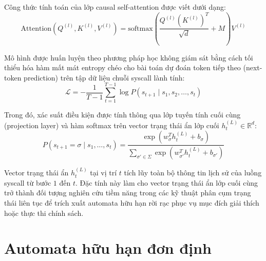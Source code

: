 \documentclass[../main.tex]{subfiles}
\begin{document}
Công thức tính toán của lớp causal self-attention được viết dưới dạng:
\begin{equation}
  \text{Attention}(Q^{(l)}, K^{(l)}, V^{(l)}) =
  \text{softmax}\left(\frac{Q^{(l)} (K^{(l)})^T}{\sqrt{d}} + M\right) V^{(l)}
\end{equation}

Mô hình được huấn luyện theo phương pháp học không giám sát bằng cách
tối thiểu hóa hàm mất mát entropy chéo cho bài toán dự đoán token
tiếp theo (next-token prediction) trên tập dữ liệu chuỗi \gls{syscall} lành tính:
\begin{equation}
  \label{eq:loss}
  \mathcal{L} = -\frac{1}{T-1} \sum_{t=1}^{T-1} \log P(s_{t+1} \mid
  s_1, s_2, \ldots, s_t)
\end{equation}

Trong đó, xác suất điều kiện được tính thông qua lớp tuyến tính cuối
cùng (projection layer) và hàm softmax trên vector trạng thái ẩn lớp
cuối $h_t^{(L)} \in \mathbb{R}^d$:
\begin{equation}
  P(s_{t+1} = \sigma \mid s_1, \ldots, s_t) = \frac{\exp(w_\sigma^T
  h_t^{(L)} + b_\sigma)}{\sum_{\sigma' \in \Sigma} \exp(w_{\sigma'}^T
  h_t^{(L)} + b_{\sigma'})}
\end{equation}

Vector trạng thái ẩn $h_t^{(L)}$ tại vị trí $t$ tích lũy toàn bộ
thông tin lịch sử của luồng \gls{syscall} từ bước $1$ đến $t$. Đặc tính này
làm cho vector trạng thái ẩn lớp cuối cùng trở thành đối tượng nghiên
cứu tiềm năng trong các kỹ thuật phân cụm trạng thái liên tục để
trích xuất automata hữu hạn rời rạc phục vụ mục đích giải thích hoặc
thực thi chính sách.

\section{Automata hữu hạn đơn định}
\label{sec:dfa}
\end{document}
